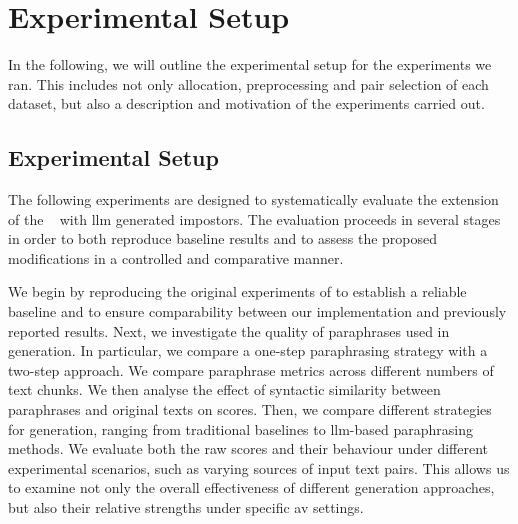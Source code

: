 \chapter{Experimental Setup}
\label{chap:experimental_setup}

In the following, we will outline the experimental setup for the experiments we ran.
This includes not only allocation, preprocessing and pair selection of each dataset, but also a description and motivation of the experiments carried out.






\section{Experimental Setup}
\label{sec:experimental_setup}

The following experiments are designed to systematically evaluate the extension of the \impAppr{}~\citep{koppel_determining_2014} with \ac{llm} generated impostors. 
The evaluation proceeds in several stages in order to both reproduce baseline results and to assess the proposed modifications in a controlled and comparative manner.

We begin by reproducing the original \impAppr{} experiments of \citet{koppel_determining_2014} to establish a reliable baseline and to ensure comparability between our implementation and previously reported results. 
Next, we investigate the quality of paraphrases used in \imp{} generation. 
In particular, we compare a one-step paraphrasing strategy with a two-step approach. 
We compare paraphrase metrics across different numbers of text chunks.
We then analyse the effect of syntactic similarity between paraphrases and original texts on \imp{} scores. 
Then, we compare different strategies for \imp{} generation, ranging from traditional baselines to \ac{llm}-based paraphrasing methods. 
We evaluate both the raw \imp{} scores and their behaviour under different experimental scenarios, such as varying sources of input text pairs. 
This allows us to examine not only the overall effectiveness of different \imp{} generation approaches, but also their relative strengths under specific \ac{av} settings.

